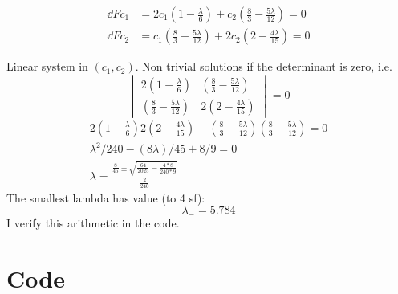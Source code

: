 \documentclass{X:/Documents/Coding/Latex/myassignment}
\begin{document}
\begin{enumerate}
	\begin{align*}
		\dd{F}{c_1} &=2c_1 \left(1 - \frac{\lambda}{6}\right) + c_2 \left(\frac{8}{3} - \frac{5\lambda}{12}\right) = 0\\
		\dd{F}{c_2} &=c_1\left(\frac{8}{3} - \frac{5\lambda}{12}\right) + 2c_2 \left(2 - \frac{4\lambda}{15}\right) = 0
	\end{align*}



	Linear system in $(c_1,c_2)$. Non trivial solutions if the determinant is zero, i.e.
	\[\begin{vmatrix}
		2\left(1 - \frac{\lambda}{6}\right) & \left(\frac{8}{3} - \frac{5\lambda}{12}\right)\\
		\left(\frac{8}{3} - \frac{5\lambda}{12}\right) & 2\left(2 - \frac{4\lambda}{15}\right)
	\end{vmatrix} =0\]
	\begin{align*}
		2\left(1 - \frac{\lambda}{6}\right)2\left(2 - \frac{4\lambda}{15}\right) - \left(\frac{8}{3} - \frac{5\lambda}{12}\right)\left(\frac{8}{3} - \frac{5\lambda}{12}\right)= 0\\
		\lambda^2/240 - (8\lambda)/45 + 8/9 = 0\\
		\lambda = \frac{\frac{8}{45} \pm \sqrt{\frac{64}{2025}- \frac{4*8}{240 * 9}}}{\frac{2}{240}}
	\end{align*}
	The smallest lambda has value (to 4 sf):
	\[\lambda_- = 5.784\]
	I verify this arithmetic in the code.
\end{enumerate}
\section*{Code}



\end{document}
